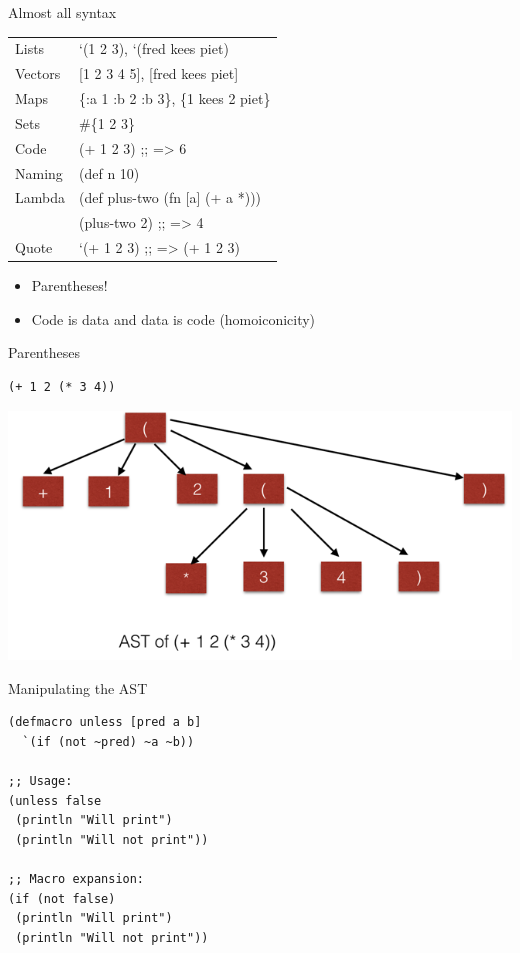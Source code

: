 \documentclass[presentation]{beamer}
\begin{document}
\begin{frame}[label=sec-1-3]{Almost all syntax}
\begin{center}
\begin{tabular}{ll}
Lists & \alert{`(1 2 3)}, \alert{`(fred kees piet)}\\
Vectors & \alert{[1 2 3 4 5]}, \alert{[fred kees piet]}\\
Maps & \alert{\{:a 1 :b 2 :b 3\}}, \alert{\{1 kees 2 piet\}}\\
Sets & \alert{\#\{1 2 3\}}\\
Code & \alert{(+ 1 2 3)}  \alert{;; => 6}\\
Naming & \alert{(def n 10)}\\
Lambda & \alert{(def plus-two (fn [a] (+ a *)))}\\
 & \alert{(plus-two 2)} \alert{;; => 4}\\
Quote & \alert{`(+ 1 2 3)} \alert{;; => (+ 1 2 3)}\\
\end{tabular}
\end{center}
\begin{itemize}
\item Parentheses!
\item Code is data and data is code (homoiconicity)
\end{itemize}
\end{frame}

\begin{frame}[fragile,label=sec-1-4]{Parentheses}
 \begin{verbatim}
(+ 1 2 (* 3 4))
\end{verbatim}
\includegraphics[width=.9\linewidth]{../images/ast.png}
\end{frame}

\begin{frame}[fragile,label=sec-1-5]{Manipulating the AST}
 \begin{verbatim}
(defmacro unless [pred a b]
  `(if (not ~pred) ~a ~b))

;; Usage:
(unless false
 (println "Will print")
 (println "Will not print"))

;; Macro expansion:
(if (not false)
 (println "Will print")
 (println "Will not print"))
\end{verbatim}
\end{frame}
\end{document}
